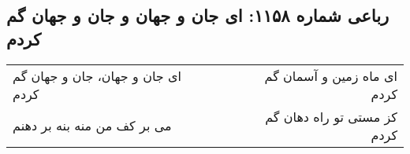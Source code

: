 \begin{center}
\section*{رباعی شماره ۱۱۵۸: ای جان و جهان و جان و جهان گم کردم}
\label{sec:1158}
\begin{longtable}{l p{0.5cm} r}
ای جان و جهان، جان و جهان گم کردم
&&
ای ماه زمین و آسمان گم کردم
\\
می بر کف من منه بنه بر دهنم
&&
کز مستی تو راه دهان گم کردم
\\
\end{longtable}
\end{center}
